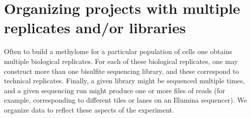 \documentclass[10pt]{article}
\begin{document}


\section{Organizing projects with multiple replicates and/or libraries}
\label{sec:organ-datas-with}

Often to build a methylome for a particular population of cells one
obtains multiple biological replicates. For each of these biological
replicates, one may construct more than one bisulfite sequencing
library, and these correspond to technical replicates. Finally, a
given library might be sequenced multiple times, and a given
sequencing run might produce one or more files of reads (for example,
corresponding to different tiles or lanes on an Illumina
sequencer). We organize data to reflect these aspects of the experiment.
\end{document}
